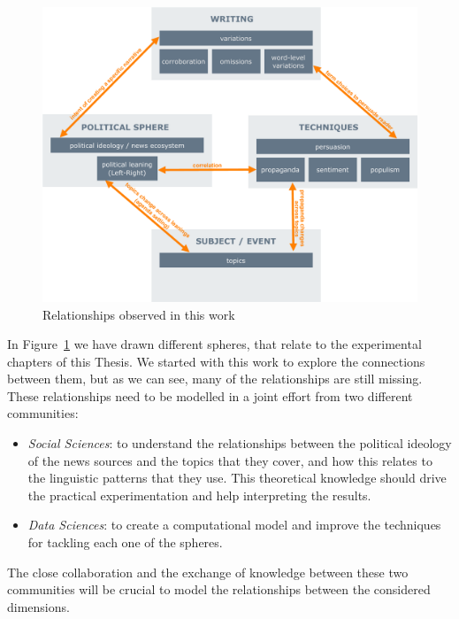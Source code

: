 \begin{figure}[!htbp]
    \centering
    \includegraphics[width=\linewidth]{relationships.pdf}
    \caption{Relationships observed in this work}
    \label{fig:relationships}
\end{figure}

In Figure~\ref{fig:relationships} we have drawn different spheres, that relate to the experimental chapters of this Thesis. We started with this work to explore the connections between them, but as we can see, many of the relationships are still missing. These relationships need to be modelled in a joint effort from two different communities:

\begin{itemize}
    \item \emph{Social Sciences}: to understand the relationships between the political ideology of the news sources and the topics that they cover, and how this relates to the linguistic patterns that they use. This theoretical knowledge should drive the practical experimentation and help interpreting the results.
    \item \emph{Data Sciences}: to create a computational model and improve the techniques for tackling each one of the spheres.
\end{itemize}
The close collaboration and the exchange of knowledge between these two communities will be crucial to model the relationships between the considered dimensions.





